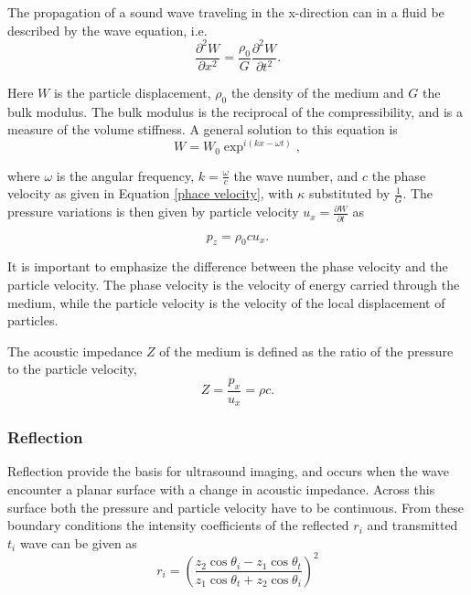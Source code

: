 The propagation of a sound wave traveling in the x-direction can in a fluid be described by the wave equation, i.e.
\begin{equation}
\label{wave equation}
\frac{\partial^2W}{\partial x^2} = \frac{\rho_0}{G}\frac{\partial^2W}{\partial t^2}.
\end{equation}

Here $W$ is the particle displacement, $\rho_0$ the density of the medium and $G$ the bulk modulus. The bulk modulus is the reciprocal of the compressibility, and is a measure of the volume stiffness. A general solution to this equation is 
\begin{equation}
\label{particle displacement}
W = W_0 \exp^{i(kx - \omega t)},
\end{equation}

where $\omega$ is the angular frequency, $k = \frac{\omega}{c}$ the wave number, and $c$ the phase velocity as given in Equation \eqref{phace velocity}, with $\kappa$ substituted by $\frac{1}{G}$. The pressure variations is then given by particle velocity $u_x = \frac{\partial W}{\partial t}$ as 

\begin{equation}
\label{pressure wave}
p_z = \rho_0 c u_x.
\end{equation}

It is important to emphasize the difference between the phase velocity and the particle velocity. The phase velocity is the velocity of energy carried through the medium, while the particle velocity is the velocity of the local displacement of particles.

The acoustic impedance $Z$ of the medium is defined as the ratio of the pressure to the particle velocity,
\begin{equation}
\label{acoustic impedance}
 Z = \frac{p_x}{u_x} = \rho c.
\end{equation}

 
\subsubsection{Reflection}
Reflection provide the basis for ultrasound imaging, and occurs when the wave encounter a planar surface with a change in acoustic impedance. Across this surface both the pressure and particle velocity have to be continuous. From these boundary conditions 
the intensity coefficients of the reflected $r_i$ and transmitted $t_i$ wave can be given as \cite{wells1969physical}
\begin{equation}
\label{fresnel}
r_i = \left(\frac{z_2 \cos \theta_i - z_1 \cos \theta_t}{z_1 \cos \theta_t + z_2 \cos \theta_i}\right)^2
\end{equation}

